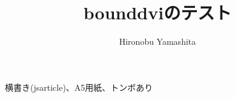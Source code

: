 \documentclass[a5paper,tombow]{jsarticle}
\title{\textsf{bounddvi}のテスト}
\author{Hironobu Yamashita}
\begin{document}
横書き(jsarticle)、A5用紙、トンボあり
\end{document}
